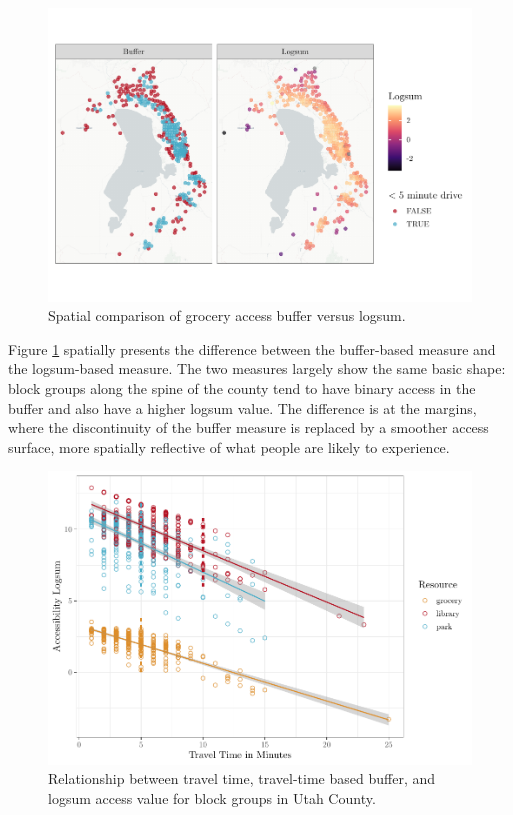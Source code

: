 \documentclass[3p, authoryear]{elsarticle} %
\begin{document}
\begin{figure}
\centering
\includegraphics{Community_Resources_files/figure-latex/access-map-1.pdf}
\caption{\label{fig:access-map}Spatial comparison of grocery access buffer versus logsum.}
\end{figure}

Figure \ref{fig:access-map} spatially presents the difference between the
buffer-based measure and the logsum-based measure. The two measures largely
show the same basic shape: block groups along the spine of the county tend
to have binary access in the buffer and also have a higher logsum value. The
difference is at the margins, where the discontinuity of the buffer measure
is replaced by a smoother access surface, more spatially reflective of what
people are likely to experience.

\begin{figure}
\centering
\includegraphics{Community_Resources_files/figure-latex/access-plot-1.pdf}
\caption{\label{fig:access-plot}Relationship between travel time, travel-time based buffer, and logsum access value for block groups in Utah County.}
\end{figure}
\end{document}
